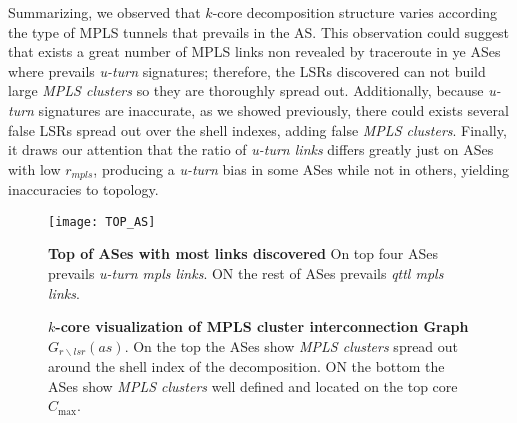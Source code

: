 Summarizing, we observed that  $k$-core decomposition structure varies according the type of MPLS tunnels that prevails in the AS. 
This observation could suggest that exists a great number of MPLS links non revealed by traceroute in ye ASes where prevails \textit{u-turn} signatures; therefore, the LSRs discovered can not build large \textit{MPLS clusters} so they are thoroughly spread out. 
Additionally, because \textit{u-turn} signatures are inaccurate, as we showed previously, there could exists several false LSRs spread out over the shell indexes, adding false \textit{MPLS clusters}. 
Finally, it draws our attention that the ratio of \textit{u-turn links} differs greatly just on ASes with low $r_{mpls}$, producing a \textit{u-turn} bias in some ASes while not in others, yielding inaccuracies to topology.


\begin{figure}[!htb]
\centering
\texttt{[image: TOP\_AS]}
\caption{\textbf{Top of ASes with most links discovered} On top four ASes prevails \textit{u-turn mpls links}. ON the rest of ASes prevails \textit{qttl mpls links}.}
\label{top_as}
\end{figure}

\begin{figure*}[!htb]
\centering
\subfloat[AS1299  Teliasonera AB , $C_{\max}=21$, $\text{Degree}_{\max}=2781$]{\texttt{[image: 1299]}%
\label{fig_cluster_mpls_1299}}
\hfill
\subfloat[AS174 Congent Communication, $C_{\max}=8$, $\text{Degree}_{\max}=751$]{\texttt{[image: 174]}%
\label{fig_cluster_mpls_174}}
\hfill
\subfloat[AS6762 Telecom Italia, $C_{\max}=10$, $\text{Degree}_{\max}=564$]{\texttt{[image: 6762]}%
\label{fig_cluster_mpls_6762}}
\hfill
\subfloat[AS7018 AT\&T, $C_{\max}=3$, $\text{Degree}_{\max}=745$]{\texttt{[image: 2914]}%
\label{fig_cluster_mpls_2914}}
\hfil
\subfloat[ AS1273 Cable and Wireless Worldwide plc, $C_{\max}=3$, $\text{Degree}_{\max}=806$]{\texttt{[image: 1273]}%
\label{fig_cluster_mpls_1273}}
\hfil
\subfloat[AS2914 Citicorp, $C_{\max}=4$, $\text{Degree}_{\max}=745$]{\texttt{[image: 7018]}%
\label{fig_cluster_mpls_7018}}
\caption{\textbf{$k$-core visualization of MPLS cluster interconnection Graph $G_{r\backslash lsr}(as)$}. On the top the ASes show \textit{MPLS clusters} spread out around the shell index of the decomposition. ON the bottom the ASes show \textit{MPLS clusters} well defined and located on the top core $C_{\max}$.}
\label{fig_cluster_mpls}
\end{figure*}
